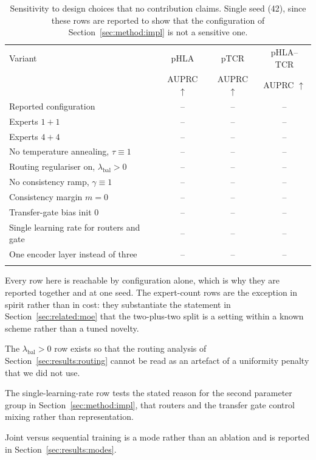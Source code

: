 \documentclass[webpdf,modern,large,namedate]{oup-authoring-template}
\theoremstyle{thmstyleone}
\theoremstyle{thmstyletwo}
\theoremstyle{thmstylethree}
\newcommand{\NA}{--}
\newcommand{\PH}{pHLA}
\newcommand{\PT}{pTCR}
\newcommand{\PHT}{pHLA--TCR}
\begin{document}
\begin{appendices}
\begin{table}[!t]
\caption{Sensitivity to design choices that no contribution claims. Single
seed (42), since these rows are reported to show that the configuration of
Section~\ref{sec:method:impl} is not a sensitive
one.\label{tab:app:sensitivity}}
\begin{tabular*}{\columnwidth}{@{\extracolsep\fill}lccc@{\extracolsep\fill}}
\toprule
Variant & \PH{} & \PT{} & \PHT{}\\
 & AUPRC $\uparrow$ & AUPRC $\uparrow$ & AUPRC $\uparrow$\\
\midrule
Reported configuration             & \NA & \NA & \NA\\
\midrule
Experts $1+1$                      & \NA & \NA & \NA\\
Experts $4+4$                      & \NA & \NA & \NA\\
No temperature annealing, $\tau\equiv1$ & \NA & \NA & \NA\\
Routing regulariser on, $\lambda_{\mathrm{bal}}>0$ & \NA & \NA & \NA\\
No consistency ramp, $\gamma\equiv1$ & \NA & \NA & \NA\\
Consistency margin $m=0$           & \NA & \NA & \NA\\
Transfer-gate bias init $0$        & \NA & \NA & \NA\\
Single learning rate for routers and gate & \NA & \NA & \NA\\
One encoder layer instead of three & \NA & \NA & \NA\\
\botrule
\end{tabular*}
\begin{tablenotes}%
\item Every row here is reachable by configuration alone, which is why they
are reported together and at one seed. The expert-count rows are the exception
in spirit rather than in cost: they substantiate the statement in
Section~\ref{sec:related:moe} that the two-plus-two split is a setting within a
known scheme rather than a tuned novelty.
\item The $\lambda_{\mathrm{bal}}>0$ row exists so that the routing analysis of
Section~\ref{sec:results:routing} cannot be read as an artefact of a
uniformity penalty that we did not use.
\item The single-learning-rate row tests the stated reason for the second
parameter group in Section~\ref{sec:method:impl}, that routers and the
transfer gate control mixing rather than representation.
\item Joint versus sequential training is a mode rather than an ablation and
is reported in Section~\ref{sec:results:modes}.
\end{tablenotes}
\end{table}


\end{appendices}
\end{document}

